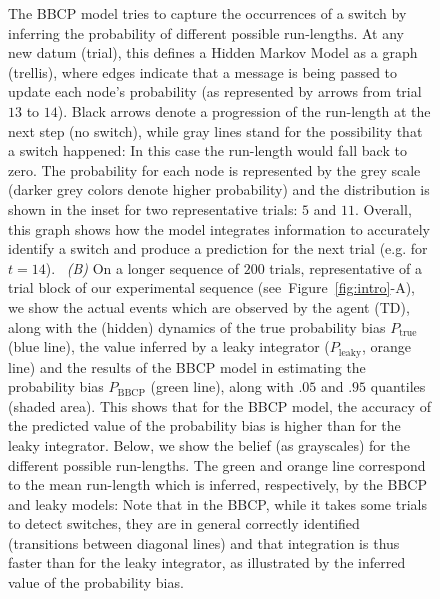 \documentclass[10pt,letterpaper]{article}
\newcommand{\seeFig}[1]{Figure~\ref{fig:#1}}
\newcommand{\CP}[1]{\textbf{\textcolor{green}{[CP: #1]}}}
\begin{document}
\begin{figure}
{The BBCP model tries to capture the occurrences of a switch
by inferring the probability of different possible run-lengths.
At any new datum (trial), this defines a Hidden Markov Model
as a graph (trellis), where %
edges indicate that a message is being passed
to update each node's probability (as represented by arrows from trial $13$ to $14$).
Black arrows denote a progression of the run-length at the next step (no switch),
while gray lines stand for the possibility that a switch happened:
In this case the run-length would fall back to zero.
The probability for each node is represented by the grey scale (darker grey colors denote higher probability)
and the distribution is shown in the inset for two representative trials: $5$ and $11$.
Overall, this graph shows how the model integrates information to accurately identify a switch
and produce a prediction for the next trial (e.g. for $t=14$).
~\textit{(B)} On a longer sequence of $200$ trials,
representative of a trial block of our experimental sequence (see~\seeFig{intro}-A), %
we show %
the actual events which are observed by the agent (TD),
along with the (hidden) dynamics of the true probability bias $P_{\text{true}}$ (blue line),
the value inferred by a leaky integrator ($P_{\text{leaky}}$, orange line)
and the results of the BBCP model
in estimating the probability bias $P_{\text{BBCP}}$ (green line),
along with $.05$ and $.95$ quantiles (shaded area).
This shows that for the BBCP model,
the accuracy of the predicted value of the probability bias
is higher than for the leaky integrator.
Below, we show the belief (as grayscales) for the different possible run-lengths.
The green and orange line correspond to the mean run-length which is inferred,
respectively, by the BBCP and leaky models:
Note that in the BBCP, while it takes some trials to detect switches,
they are in general correctly identified (transitions between diagonal lines) and
that integration is thus faster than for the leaky integrator,
as illustrated by the inferred value of the probability bias.
}
\label{fig:Bayesianchangepoint}
\end{figure}
\end{document}
